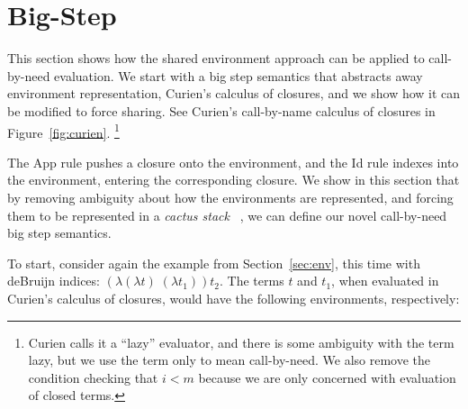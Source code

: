 \section{Big-Step \ce} \label{sec:calc}

This section shows how the shared environment approach can be applied to
call-by-need evaluation. We start with a big step semantics that abstracts away
environment representation, Curien's calculus of closures, and we show how it
can be modified to force sharing. See Curien's call-by-name calculus of closures
in Figure~\ref{fig:curien}. \footnote{Curien calls it a ``lazy'' evaluator, and
there is some ambiguity with the term lazy, but we use the term only to mean
call-by-need. We also remove the condition checking that $i < m$ because we are
only concerned with evaluation of closed terms.}

The App rule pushes a closure onto the environment, and the Id rule indexes
into the environment, entering the corresponding closure. We show in this
section that by removing ambiguity about how the environments are represented,
and forcing them to be represented in a \emph{cactus stack}
~\cite{stenstrom1988vlsi}, we can define our novel call-by-need big step semantics.

To start, consider again the example from Section~\ref{sec:env}, this time with
deBruijn indices: $(\lambda(\lambda t) \; (\lambda t_1)) t_2$.  The terms $t$
and $t_1$, when evaluated in Curien's calculus of closures, would have the
following environments, respectively: 

\begin{center}
\end{center}

